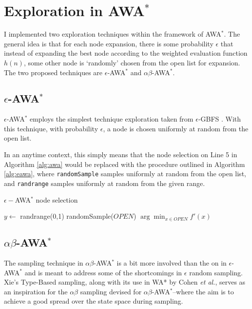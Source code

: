 \section{Exploration in AWA$^*$}
I implemented two exploration techniques within the framework of AWA$^*$. The general idea is that for each node expansion, there is some probability $\epsilon$ that instead of expanding the best node according to the weighted evaluation function $h(n)$, some other node is `randomly' chosen from the open list for expansion. The two proposed techniques are $\epsilon$-AWA$^*$ and  $\alpha \beta$-AWA$^*$.

\subsection{$\epsilon$-AWA$^*$}
$\epsilon$-AWA$^*$ employs the simplest technique exploration taken from $\epsilon$-GBFS \cite{valenzano2016completeness}\cite{valenzano2014comparison}. With this technique, with probability $\epsilon$, a node is chosen uniformly at random from the open list.

In an anytime context, this simply means that the node selection on Line 5 in Algorithm \ref{alg:awa} would be replaced with the procedure outlined in Algorithm \ref{alg:eawa}, where \texttt{randomSample} samples uniformly at random from the open list, and \texttt{randrange} samples uniformly at random from the given range.

\begin{algorithm}
\caption{$\epsilon-$AWA$^*$ node selection}\label{alg:eawa}
\begin{algorithmic}
\State $y \gets $ randrange(0,1)
    \State\Return randomSample($OPEN$)
\Else{}
    \State\Return $\arg \min_{x \in OPEN} f'(x)$
\EndIf
\end{algorithmic}
\end{algorithm}

\subsection{$\alpha \beta$-AWA$^*$}
The sampling technique in $\alpha \beta$-AWA$^*$ is a bit more involved than the on in $\epsilon$-AWA$^*$ and is meant to address some of the shortcomings in $\epsilon$ random sampling. Xie's Type-Based sampling, along with its use in WA* by Cohen \textit{et al.}, serves as an inspiration for the $\alpha \beta$ sampling devised for $\alpha \beta$-AWA$^*$--where the aim is to achieve a good spread over the state space during sampling.


